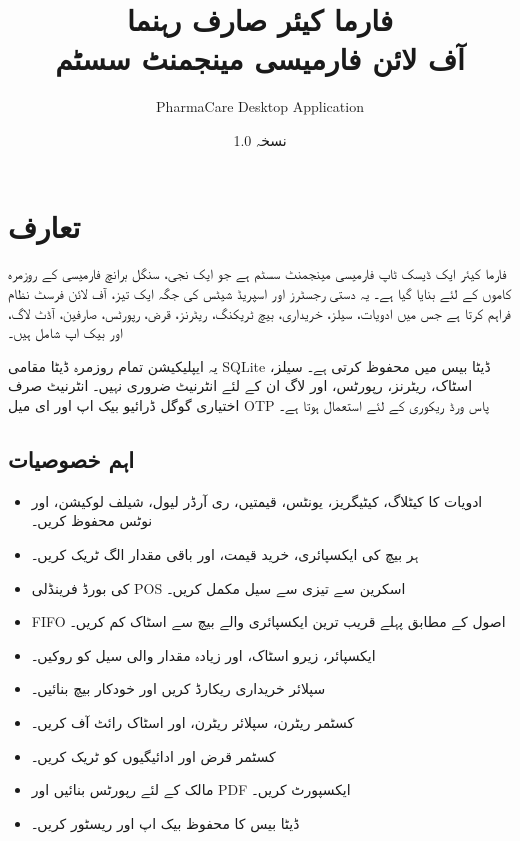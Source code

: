 \documentclass[12pt,a4paper]{article}
\title{\Huge\textbf{فارما کیئر صارف رہنما}\\\large آف لائن فارمیسی مینجمنٹ سسٹم}
\author{PharmaCare Desktop Application}
\date{نسخہ 1.0}
\begin{document}
\maketitle
\thispagestyle{empty}
\begin{center}
\vspace{1cm}
\end{center}
\newpage

\tableofcontents
\newpage

\section{تعارف}
فارما کیئر ایک ڈیسک ٹاپ فارمیسی مینجمنٹ سسٹم ہے جو ایک نجی، سنگل برانچ فارمیسی کے روزمرہ کاموں کے لئے بنایا گیا ہے۔ یہ دستی رجسٹرز اور اسپریڈ شیٹس کی جگہ ایک تیز، آف لائن فرسٹ نظام فراہم کرتا ہے جس میں ادویات، سیلز، خریداری، بیچ ٹریکنگ، ریٹرنز، قرض، رپورٹس، صارفین، آڈٹ لاگ، اور بیک اپ شامل ہیں۔

یہ ایپلیکیشن تمام روزمرہ ڈیٹا مقامی SQLite ڈیٹا بیس میں محفوظ کرتی ہے۔ سیلز، اسٹاک، ریٹرنز، رپورٹس، اور لاگ ان کے لئے انٹرنیٹ ضروری نہیں۔ انٹرنیٹ صرف اختیاری گوگل ڈرائیو بیک اپ اور ای میل OTP پاس ورڈ ریکوری کے لئے استعمال ہوتا ہے۔

\subsection{اہم خصوصیات}
\begin{itemize}
  \item ادویات کا کیٹلاگ، کیٹیگریز، یونٹس، قیمتیں، ری آرڈر لیول، شیلف لوکیشن، اور نوٹس محفوظ کریں۔
  \item ہر بیچ کی ایکسپائری، خرید قیمت، اور باقی مقدار الگ ٹریک کریں۔
  \item کی بورڈ فرینڈلی POS اسکرین سے تیزی سے سیل مکمل کریں۔
  \item FIFO اصول کے مطابق پہلے قریب ترین ایکسپائری والے بیچ سے اسٹاک کم کریں۔
  \item ایکسپائر، زیرو اسٹاک، اور زیادہ مقدار والی سیل کو روکیں۔
  \item سپلائر خریداری ریکارڈ کریں اور خودکار بیچ بنائیں۔
  \item کسٹمر ریٹرن، سپلائر ریٹرن، اور اسٹاک رائٹ آف کریں۔
  \item کسٹمر قرض اور ادائیگیوں کو ٹریک کریں۔
  \item مالک کے لئے رپورٹس بنائیں اور PDF ایکسپورٹ کریں۔
  \item ڈیٹا بیس کا محفوظ بیک اپ اور ریسٹور کریں۔
\end{itemize}
\end{document}
